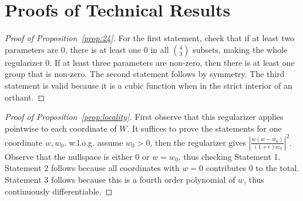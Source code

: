 
\section{Proofs of Technical Results}\label{sec:proofs}
\begin{proof}[Proof of Proposition~\ref{prop:24}]
For the first statement, check that if at least two parameters are $0$, there is at least one $0$ in all $4\choose3$ subsets, making the whole regularizer $0$. If at least three parameters are non-zero, then there is at least one group that is non-zero. The second statement follows by symmetry.  The third statement is valid because it is a cubic function when in the strict interior of an orthant.
\end{proof}

\begin{proof}[Proof of Proposition~\ref{prop:locality}]
First observe that this regularizer applies pointwise to each coordinate of $W$. It suffices to prove the statements for one coordinate $w, w_0$. w.l.o.g. assume $w_0>0$, then the regularizer gives $\left|\frac{w(w-w_0)}{(1+\epsilon)w_0}\right|^2$. Observe that the nullspace is either $0$ or $w=w_0$, thus checking Statement 1. Statement 2 follows because all coordinates with $w = 0$ contributes $0$ to the total.  Statement 3 follows because this is a fourth order polynomial of $w$, thus continuously differentiable.
\end{proof}

